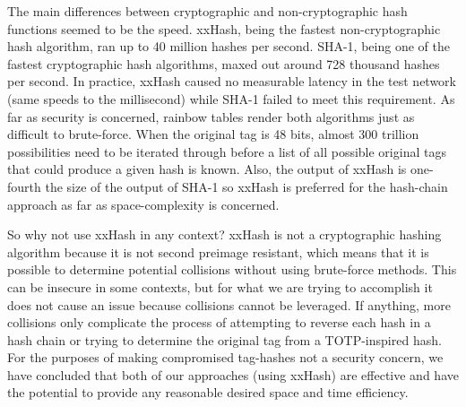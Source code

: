 \documentclass[12pt]{article} %
\begin{document}
The main differences between cryptographic and non-cryptographic hash functions seemed to be the speed. xxHash, being the fastest non-cryptographic hash algorithm, ran up to 40 million hashes per second. SHA-1, being one of the fastest cryptographic hash algorithms, maxed out around 728 thousand hashes per second. In practice, xxHash caused no measurable latency in the test network (same speeds to the millisecond) while SHA-1 failed to meet this requirement. As far as security is concerned, rainbow tables render both algorithms just as difficult to brute-force. When the original tag is 48 bits, almost 300 trillion possibilities need to be iterated through before a list of all possible original tags that could produce a given hash is known. Also, the output of xxHash is one-fourth the size of the output of SHA-1 so xxHash is preferred for the hash-chain approach as far as space-complexity is concerned.

So why not use xxHash in any context? xxHash is not a cryptographic hashing algorithm because it is not second preimage resistant, which means that it is possible to determine potential collisions without using brute-force methods. This can be insecure in some contexts, but for what we are trying to accomplish it does not cause an issue because collisions cannot be leveraged. If anything, more collisions only complicate the process of attempting to reverse each hash in a hash chain or trying to determine the original tag from a TOTP-inspired hash. For the purposes of making compromised tag-hashes not a security concern, we have concluded that both of our approaches (using xxHash) are effective and have the potential to provide any reasonable desired space and time efficiency.





%

\end{document}
